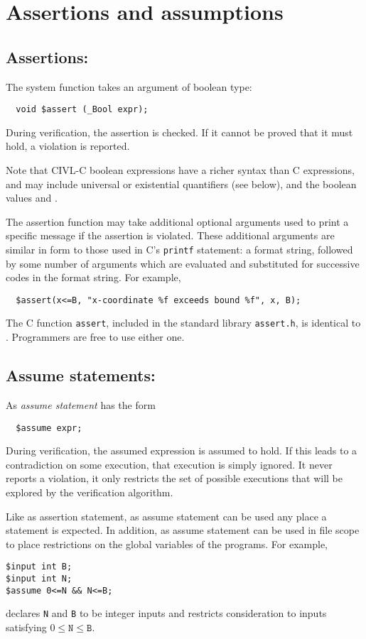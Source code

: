 \section{Assertions and assumptions}

\subsection{Assertions: \cassert}

The system function \cassert{} takes an argument of boolean type:
\begin{verbatim}
  void $assert (_Bool expr);
\end{verbatim}
During verification, the assertion is checked.  If it cannot be proved
that it must hold, a violation is reported.

Note that CIVL-C boolean expressions have a richer syntax than C
expressions, and may include universal or existential quantifiers
(see below), and the boolean values  \ctrue{} and \cfalse{}.

The assertion function may take additional optional arguments used to
print a specific message if the assertion is violated.  These
additional arguments are similar in form to those used in C's
\texttt{printf} statement: a format string, followed by some number of
arguments which are evaluated and substituted for successive codes in
the format string.  For example,
\begin{verbatim}
  $assert(x<=B, "x-coordinate %f exceeds bound %f", x, B); 
\end{verbatim}

The C function \texttt{assert}, included in the standard library
\texttt{assert.h}, is identical to \cassert.  Programmers are
free to use either one.


\subsection{Assume statements: \cassume}

As \emph{assume statement} has the form
\begin{verbatim}
  $assume expr;
\end{verbatim}
During verification, the assumed expression is assumed to hold.  If
this leads to a contradiction on some execution, that execution is
simply ignored.  It never reports a violation, it only restricts the
set of possible executions that will be explored by the verification
algorithm.

Like as assertion statement, as assume statement can be used any place
a statement is expected.  In addition, as assume statement can be used
in file scope to place restrictions on the global variables of the
programs.  For example,
\begin{verbatim}
$input int B;
$input int N;
$assume 0<=N && N<=B;
\end{verbatim}
declares \texttt{N} and \texttt{B} to be integer inputs and restricts
consideration to inputs satisfying $0\leq\texttt{N}\leq\texttt{B}$.


